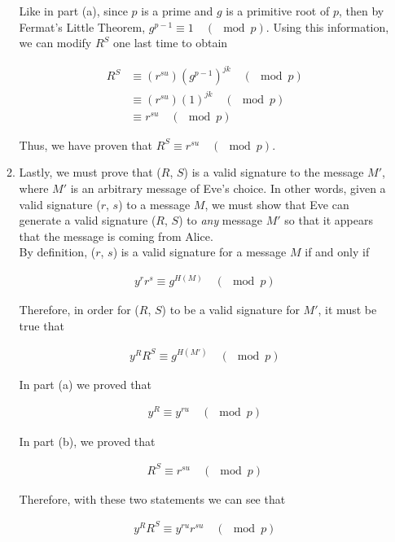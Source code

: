 \documentclass[11pt]{article}
\theoremstyle{definition}
\begin{document}
\begin{enumerate}
\begin{enumerate}
Like in part (a), since $p$ is a prime and $g$ is a primitive root of $p$, then by Fermat's Little Theorem, $g^{p - 1} \equiv 1 \quad (\mod{p})$. Using this information, we can modify $R^S$ one last time to obtain

\begin{align*}
    R^S &\equiv (r^{su}) (g^{p - 1})^{jk} \quad (\mod{p}) \\
    &\equiv (r^{su}) (1)^{jk} \quad (\mod{p}) \\
    &\equiv r^{su} \quad (\mod{p})
\end{align*}

Thus, we have proven that $R^S \equiv r^{su} \quad (\mod{p})$.
\\

\item %
Lastly, we must prove that ($R$, $S$) is a valid signature to the message $M'$, where $M'$ is an arbitrary message of Eve's choice. In other words, given a valid signature ($r$, $s$) to a message $M$, we must show that Eve can generate a valid signature ($R$, $S$) to \textit{any} message $M'$ so that it appears that the message is coming from Alice. \\

By definition, ($r$, $s$) is a valid signature for a message $M$ if and only if 

\begin{align*}
    y^rr^s \equiv g^{H(M)} \quad (\mod{p})
\end{align*}

Therefore, in order for ($R$, $S$) to be a valid signature for $M'$, it must be true that

\begin{align*}
    y^RR^S \equiv g^{H(M')} \quad (\mod{p})
\end{align*}

In part (a) we proved that 

\begin{align*}
    y^R \equiv y^{ru} \quad (\mod{p})
\end{align*}

In part (b), we proved that

\begin{align*}
    R^S \equiv r^{su} \quad (\mod{p})
\end{align*}

Therefore, with these two statements we can see that

\begin{align*}
    y^RR^S \equiv y^{ru}r^{su} \quad (\mod{p})
\end{align*}


\end{enumerate}
\end{enumerate}
\end{document}
